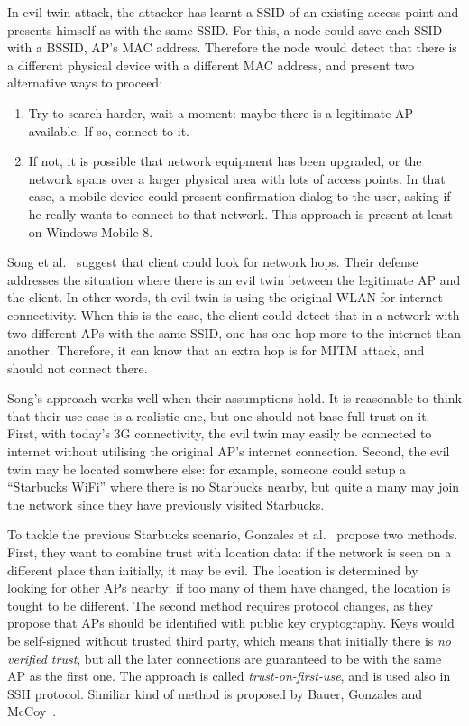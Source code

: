 \documentclass[12pt,a4paper,oneside,pdftex]{report}
\begin{document}
In evil twin attack, the attacker has learnt a SSID of an existing access point and presents himself as with the same SSID. For this, a node could save each SSID with a BSSID, AP's MAC address. Therefore the node would detect that there is a different physical device with a different MAC address, and present two alternative ways to proceed:
\begin{enumerate}
    \item Try to search harder, wait a moment: maybe there is a legitimate AP available. If so, connect to it.
    \item If not, it is possible that network equipment has been upgraded, or the network spans over a larger physical area with lots of access points. In that case, a mobile device could present confirmation dialog to the user, asking if he really wants to connect to that network. This approach is present at least on Windows Mobile 8.
\end{enumerate}

Song et al.~\cite{song2010peeping} suggest that client could look for network hops. Their defense addresses the situation where there is an evil twin between the legitimate AP and the client. In other words, th evil twin is using the original WLAN for internet connectivity. When this is the case, the client could detect that in a network with two different APs with the same SSID, one has one hop more to the internet than another. Therefore, it can know that an extra hop is for MITM attack, and should not connect there.

Song's approach works well when their assumptions hold. It is reasonable to think that their use case is a realistic one, but one should not base full trust on it. First, with today's 3G connectivity, the evil twin may easily be connected to internet without utilising the original AP's internet connection. Second, the evil twin may be located somwhere else: for example, someone could setup a ``Starbucks WiFi'' where there is no Starbucks nearby, but quite a many may join the network since they have previously visited Starbucks.

To tackle the previous Starbucks scenario, Gonzales et al.~\cite{gonzales2010practical} propose two methods. First, they want to combine trust with location data: if the network is seen on a different place than initially, it may be evil. The location is determined by looking for other APs nearby: if too many of them have changed, the location is tought to be different. The second method requires protocol changes, as they propose that APs should be identified with public key cryptography. Keys would be self-signed without trusted third party, which means that initially there is \emph{no verified trust}, but all the later connections are guaranteed to be with the same AP as the first one. The approach is called \emph{trust-on-first-use}, and is used also in SSH protocol. Similiar kind of method is proposed by Bauer, Gonzales and McCoy~\cite{bauer2008mitigating}.
\end{document}
